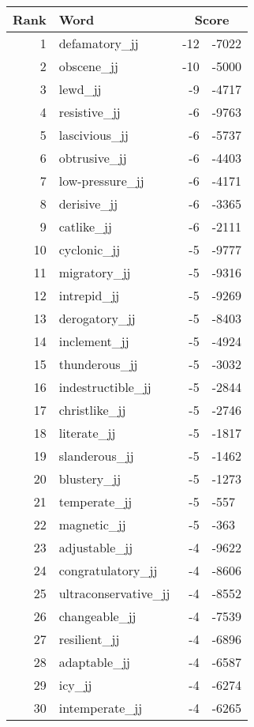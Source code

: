 \begin{longtable}[!htbp]{| rlr@{.}l |}
    \hline
    \textbf{Rank} & \textbf{Word} & \multicolumn{2}{c|}{\textbf{Score}} \\
    \hline
    \endhead
    1 & defamatory\_jj & -12 & -7022 \\
    2 & obscene\_jj & -10 & -5000 \\
    3 & lewd\_jj & -9 & -4717 \\
    4 & resistive\_jj & -6 & -9763 \\
    5 & lascivious\_jj & -6 & -5737 \\
    6 & obtrusive\_jj & -6 & -4403 \\
    7 & low-pressure\_jj & -6 & -4171 \\
    8 & derisive\_jj & -6 & -3365 \\
    9 & catlike\_jj & -6 & -2111 \\
    10 & cyclonic\_jj & -5 & -9777 \\
    11 & migratory\_jj & -5 & -9316 \\
    12 & intrepid\_jj & -5 & -9269 \\
    13 & derogatory\_jj & -5 & -8403 \\
    14 & inclement\_jj & -5 & -4924 \\
    15 & thunderous\_jj & -5 & -3032 \\
    16 & indestructible\_jj & -5 & -2844 \\
    17 & christlike\_jj & -5 & -2746 \\
    18 & literate\_jj & -5 & -1817 \\
    19 & slanderous\_jj & -5 & -1462 \\
    20 & blustery\_jj & -5 & -1273 \\
    21 & temperate\_jj & -5 & -557 \\
    22 & magnetic\_jj & -5 & -363 \\
    23 & adjustable\_jj & -4 & -9622 \\
    24 & congratulatory\_jj & -4 & -8606 \\
    25 & ultraconservative\_jj & -4 & -8552 \\
    26 & changeable\_jj & -4 & -7539 \\
    27 & resilient\_jj & -4 & -6896 \\
    28 & adaptable\_jj & -4 & -6587 \\
    29 & icy\_jj & -4 & -6274 \\
    30 & intemperate\_jj & -4 & -6265 \\

\end{longtable}
